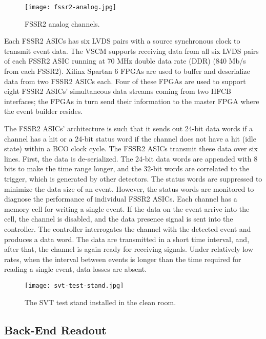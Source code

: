 \begin{figure}[hbt] 
\centering 
\texttt{[image: fssr2-analog.jpg]}
\caption{FSSR2 analog channels.}
\label{fig:fssr2-analog}
\end{figure}

Each FSSR2 ASICs has six LVDS pairs with a source synchronous clock to transmit event data. The VSCM supports receiving data from all six LVDS pairs of each FSSR2 ASIC running at 70 MHz double data rate (DDR) (840 Mb/s from each FSSR2). Xilinx Spartan 6 FPGAs are used to buffer and deserialize data from two FSSR2 ASICs each. Four of these FPGAs are used to support eight FSSR2 ASICs' simultaneous data streams coming from two HFCB interfaces; the FPGAs in turn send their information to the master FPGA where the event builder resides.

The FSSR2 ASICs' architecture is such that it sends out 24-bit data words if a channel has a hit or a 24-bit status word if the channel does not have a hit (idle state) within a BCO clock cycle. The FSSR2 ASICs transmit these data over six lines. First, the data is de-serialized. The 24-bit data words are appended with 8 bits to make the time range longer, and the 32-bit words are correlated to the trigger, which is generated by other detectors. The status words are suppressed to minimize the data size of an event. However, the status words are monitored to diagnose the performance of individual FSSR2 ASICs. Each channel has a memory cell for writing a single event. If the data on the event arrive into the cell, the channel is disabled, and the data presence signal is sent into the controller. The controller interrogates the channel with the detected event and produces a data word. The data are transmitted in a short time interval, and, after that, the channel is again ready for receiving signals. Under relatively low rates, when the interval between events is longer than the time required for reading a single event, data losses are absent. 

\begin{figure}[hbt] 
\centering 
\texttt{[image: svt-test-stand.jpg]}
\caption{The SVT test stand installed in the clean room.}
\label{fig:svt-test-stand}
\end{figure}

\subsection{Back-End Readout}

